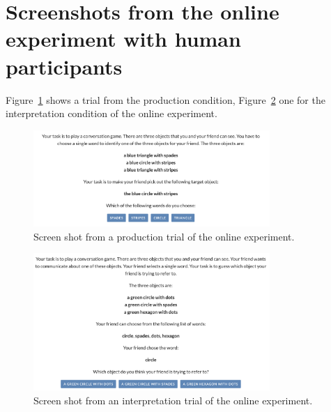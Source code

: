 \documentclass[fleqn]{article}
\begin{document}
\newpage
\appendix



\section{Screenshots from the online experiment with human participants}
\label{sec:scre-from-online}

Figure~\ref{fig:refgame-screenshot-production} shows a trial from the production condition, Figure~\ref{fig:refgame-screenshot-interpretation} one for the interpretation condition of the online experiment.

\begin{figure}[H]
  \centering
  \includegraphics[width = 0.8\textwidth]{00-pics/refgame-production.png}

  \caption{Screen shot from a production trial of the online experiment.}
  \label{fig:refgame-screenshot-production}
\end{figure}

\begin{figure}[H]
  \centering
  \includegraphics[width = 0.8\textwidth]{00-pics/refgame-interpretation.png}

  \caption{Screen shot from an interpretation trial of the online experiment.}
  \label{fig:refgame-screenshot-interpretation}
\end{figure}
\end{document}
